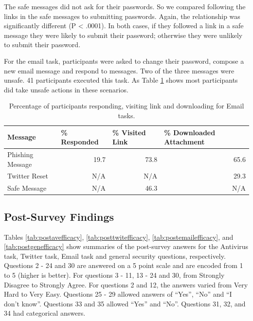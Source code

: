 The safe messages did not ask for their passwords. So we compared following the links in the safe messages to submitting passwords. Again, the relationship was significantly different (P < .0001). In both cases, if they followed a link in a safe message they were likely to submit their password; otherwise they were unlikely to submit their password.

For the email task, participants were asked to change their password, compose a new email message and respond to messages. Two of the three messages were unsafe. 41 participants executed this task. As Table \ref{tab:emailtask} shows most participants did take unsafe actions in these scenarios.

\begin{table}[tpb]
\caption{Percentage of participants responding, visiting link and downloading for Email tasks.}
\label{tab:emailtask}
\begin{tabular}{|l|r|r|r|}
\hline
Message & \multicolumn{1}{l|}{\% Responded} & \multicolumn{1}{l|}{\% Visited Link} & \multicolumn{1}{l|}{\% Downloaded Attachment} \\ \hline
Phishing Message & 19.7 & 73.8 & 65.6 \\
Twitter Reset    & N/A  & N/A  & 29.3 \\
Safe Message     & N/A  & 46.3 & N/A  \\ \hline
\end{tabular}
\end{table}

\subsection{Post-Survey Findings}
Tables \ref{tab:postavefficacy}, \ref{tab:posttwitefficacy}, \ref{tab:postemailefficacy}, and \ref{tab:postgenefficacy} show summaries of the post-survey answers for the Antivirus task, Twitter task, Email task and general security questions, respectively. Questions 2 - 24 and 30 are answered on a 5 point scale and are encoded from 1 to 5 (higher is better). For questions 3 - 11, 13 - 24 and 30, from Strongly Disagree to Strongly Agree. For questions 2 and 12, the answers varied from Very Hard to Very Easy. Questions 25 - 29 allowed answers of ``Yes'', ``No'' and ``I don't know''. Questions 33 and 35 allowed ``Yes'' and ``No''. Questions 31, 32, and 34 had categorical answers.

